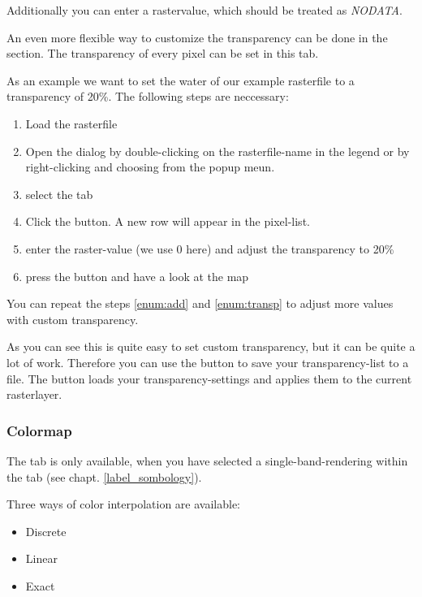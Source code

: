 Additionally you can enter a rastervalue, which should be treated as
{\em NODATA}.

An even more flexible way to customize the transparency can be done in the
 section.
The transparency of every pixel can be set in this tab.

As an example we want to set the water of our example rasterfile
 to a transparency of 20\%. The following steps
are neccessary:
\begin{enumerate}
 \item  Load the rasterfile 
 \item Open the  dialog by double-clicking on the
 rasterfile-name in the legend or by right-clicking and choosing
  from the popup meun.
 \item select the  tab
 \item \label{enum:add} Click the 
 button. A new row will appear in the pixel-list.
 \item \label{enum:transp} enter the raster-value (we use 0 here) and adjust the
 transparency to 20\%
 \item press the  button and have a look at the map
\end{enumerate}

You can repeat the steps \ref{enum:add} and \ref{enum:transp} to adjust
more values with custom transparency.

As you can see this is quite easy to set custom transparency, but it can be
quite a lot of work. Therefore you can use the button
 to save your
transparency-list to a file. The button
 loads your
transparency-settings and applies them to the current rasterlayer.

\subsubsection{Colormap} \label{label_colormaptab}

The  tab is only available, when you have selected a
single-band-rendering within the tab  (see chapt. \ref{label_sombology}).

Three ways of color interpolation are available:
\begin{itemize}
\item Discrete
\item Linear 
\item Exact
\end{itemize}

